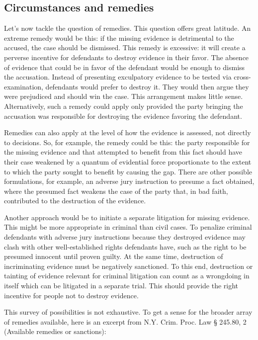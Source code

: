\documentclass[
  10pt,
  dvipsnames,enabledeprecatedfontcommands]{scrartcl}
\begin{document}
\hypertarget{circumstances-and-remedies}{%
\subsection{Circumstances and
remedies}\label{circumstances-and-remedies}}

Let's now tackle the question of remedies. This question offers great
latitude. An extreme remedy would be this: if the missing evidence is
detrimental to the accused, the case should be dismissed. This remedy is
excessive: it will create a perverse incentive for defendants to destroy
evidence in their favor. The absence of evidence that could be in favor
of the defendant would be enough to dismiss the accusation. Instead of
presenting exculpatory evidence to be tested via cross-examination,
defendants would prefer to destroy it. They would then argue they were
prejudiced and should win the case. This arrangement makes little sense.
Alternatively, such a remedy could apply only provided the party
bringing the accusation was responsible for destroying the evidence
favoring the defendant.

Remedies can also apply at the level of how the evidence is assessed,
not directly to decisions. So, for example, the remedy could be this:
the party responsible for the missing evidence and that attempted to
benefit from this fact should have their case weakened by a quantum of
evidential force proportionate to the extent to which the party sought
to benefit by causing the gap. There are other possible formulations,
for example, an adverse jury instruction to presume a fact obtained,
where the presumed fact weakens the case of the party that, in bad
faith, contributed to the destruction of the evidence.

Another approach would be to initiate a separate litigation for missing
evidence. This might be more appropriate in criminal than civil cases.
To penalize criminal defendants with adverse jury instructions because
they destroyed evidence may clash with other well-established rights
defendants have, such as the right to be presumed innocent until proven
guilty. At the same time, destruction of incriminating evidence must be
negatively sanctioned. To this end, destruction or tainting of evidence
relevant for criminal litigation can count as a wrongdoing in itself
which can be litigated in a separate trial. This should provide the
right incentive for people not to destroy evidence.

This survey of possibilities is not exhaustive. To get a sense for the
broader array of remedies available, here is an excerpt from N.Y. Crim.
Proc. Law § 245.80, 2 (Available remedies or sanctions):
\end{document}
